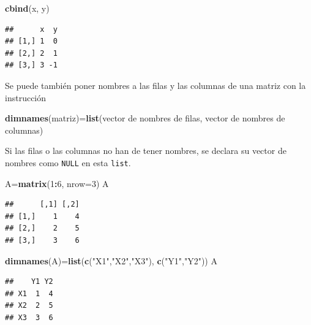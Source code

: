\documentclass[]{book}
\newenvironment{Shaded}{\begin{snugshade}}{\end{snugshade}}
\newcommand{\DataTypeTok}[1]{\textcolor[rgb]{0.13,0.29,0.53}{#1}}
\newcommand{\DecValTok}[1]{\textcolor[rgb]{0.00,0.00,0.81}{#1}}
\newcommand{\KeywordTok}[1]{\textcolor[rgb]{0.13,0.29,0.53}{\textbf{#1}}}
\newcommand{\NormalTok}[1]{#1}
\newcommand{\OperatorTok}[1]{\textcolor[rgb]{0.81,0.36,0.00}{\textbf{#1}}}
\newcommand{\StringTok}[1]{\textcolor[rgb]{0.31,0.60,0.02}{#1}}
\theoremstyle{definition}
\theoremstyle{definition}
\theoremstyle{definition}
\theoremstyle{remark}
\begin{document}
\begin{Shaded}
\begin{Highlighting}[]
\KeywordTok{cbind}\NormalTok{(x, y)}
\end{Highlighting}
\end{Shaded}

\begin{verbatim}
##      x  y
## [1,] 1  0
## [2,] 2  1
## [3,] 3 -1
\end{verbatim}

Se puede también poner nombres a las filas y las columnas de una matriz con la instrucción

\begin{Shaded}
\begin{Highlighting}[]
\KeywordTok{dimnames}\NormalTok{(matriz)=}\KeywordTok{list}\NormalTok{(vector de nombres de filas, vector de nombres de columnas)}
\end{Highlighting}
\end{Shaded}

Si las filas o las columnas no han de tener nombres, se declara su vector de nombres como \texttt{NULL} en esta \texttt{list}.

\begin{Shaded}
\begin{Highlighting}[]
\NormalTok{A=}\KeywordTok{matrix}\NormalTok{(}\DecValTok{1}\OperatorTok{:}\DecValTok{6}\NormalTok{, }\DataTypeTok{nrow=}\DecValTok{3}\NormalTok{)}
\NormalTok{A}
\end{Highlighting}
\end{Shaded}

\begin{verbatim}
##      [,1] [,2]
## [1,]    1    4
## [2,]    2    5
## [3,]    3    6
\end{verbatim}

\begin{Shaded}
\begin{Highlighting}[]
\KeywordTok{dimnames}\NormalTok{(A)=}\KeywordTok{list}\NormalTok{(}\KeywordTok{c}\NormalTok{(}\StringTok{"X1"}\NormalTok{,}\StringTok{"X2"}\NormalTok{,}\StringTok{"X3"}\NormalTok{), }\KeywordTok{c}\NormalTok{(}\StringTok{"Y1"}\NormalTok{,}\StringTok{"Y2"}\NormalTok{))}
\NormalTok{A}
\end{Highlighting}
\end{Shaded}

\begin{verbatim}
##    Y1 Y2
## X1  1  4
## X2  2  5
## X3  3  6
\end{verbatim}
\end{document}
